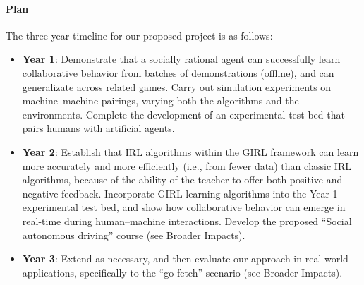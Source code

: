 
\vspace{\up}
\paragraph{Plan}

The three-year timeline for our proposed project is as follows:

\begin{itemize}
\item {\bf Year 1}: Demonstrate that a socially rational agent can
  successfully learn collaborative behavior from batches of
  demonstrations (offline), and can generalizate across related games.
  Carry out simulation experiments on machine--machine pairings,
  varying both the algorithms and the environments.  Complete the
  development of an experimental test bed that pairs humans with
  artificial agents.

\item {\bf Year 2}: Establish that IRL algorithms within the GIRL
  framework can learn more accurately and more efficiently (i.e., from
  fewer data) than classic IRL algorithms, because of the ability of
  the teacher to offer both positive and negative feedback.
  Incorporate GIRL learning algorithms into the Year 1 experimental
  test bed, and show how collaborative behavior can emerge in
  real-time during human--machine interactions.  Develop the proposed
  ``Social autonomous driving'' course (see Broader Impacts).

\item {\bf Year 3}: Extend as necessary, and then evaluate our
  approach in real-world applications, specifically to the ``go
  fetch'' scenario (see Broader Impacts).

\end{itemize}

